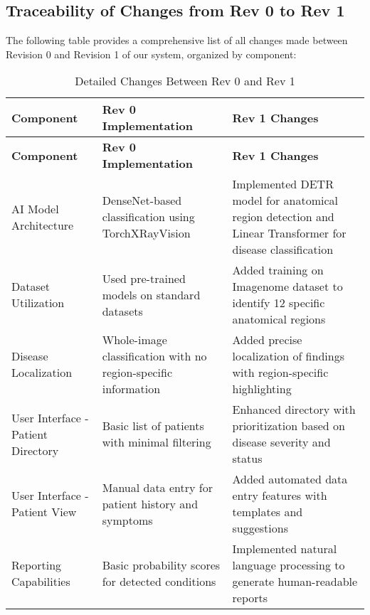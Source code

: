 \documentclass{article}
\begin{document}
\newpage
\subsection{Traceability of Changes from Rev 0 to Rev 1}

The following table provides a comprehensive list of all changes made between Revision 0 and Revision 1 of our system, organized by component:

\begin{longtable}{| p{} | p{} | p{} |}
    \caption{Detailed Changes Between Rev 0 and Rev 1} \\
    \hline
    \textbf{Component} & \textbf{Rev 0 Implementation} & \textbf{Rev 1 Changes} \\
    \hline
    \endfirsthead
    \hline
    \textbf{Component} & \textbf{Rev 0 Implementation} & \textbf{Rev 1 Changes} \\
    \hline
    \endhead
    \hline
    \endfoot
    
    AI Model Architecture & DenseNet-based classification using TorchXRayVision & Implemented DETR model for anatomical region detection and Linear Transformer for disease classification \\
    \hline
    
    Dataset Utilization & Used pre-trained models on standard datasets & Added training on Imagenome dataset to identify 12 specific anatomical regions \\
    \hline
    
    Disease Localization & Whole-image classification with no region-specific information & Added precise localization of findings with region-specific highlighting \\
    \hline
    
    User Interface - Patient Directory & Basic list of patients with minimal filtering & Enhanced directory with prioritization based on disease severity and status \\
    \hline
    
    User Interface - Patient View & Manual data entry for patient history and symptoms & Added automated data entry features with templates and suggestions \\
    \hline
    
    Reporting Capabilities & Basic probability scores for detected conditions & Implemented natural language processing to generate human-readable reports \\
    \hline
        

\end{longtable}
\end{document}
